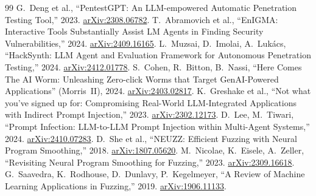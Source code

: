 \documentclass[11pt,a4paper]{article}
\newcommand{\arxiv}[1]{\href{https://arxiv.org/abs/#1}{arXiv:#1}}
\begin{document}
\begin{thebibliography}{99}
 G.~Deng et al., ``PentestGPT: An LLM-empowered Automatic Penetration Testing Tool,'' 2023. \arxiv{2308.06782}.
 T.~Abramovich et al., ``EnIGMA: Interactive Tools Substantially Assist LM Agents in Finding Security Vulnerabilities,'' 2024. \arxiv{2409.16165}.
 L.~Muzsai, D.~Imolai, A.~Luk\'acs, ``HackSynth: LLM Agent and Evaluation Framework for Autonomous Penetration Testing,'' 2024. \arxiv{2412.01778}.
 S.~Cohen, R.~Bitton, B.~Nassi, ``Here Comes The AI Worm: Unleashing Zero-click Worms that Target GenAI-Powered Applications'' (Morris~II), 2024. \arxiv{2403.02817}.
 K.~Greshake et al., ``Not what you've signed up for: Compromising Real-World LLM-Integrated Applications with Indirect Prompt Injection,'' 2023. \arxiv{2302.12173}.
 D.~Lee, M.~Tiwari, ``Prompt Infection: LLM-to-LLM Prompt Injection within Multi-Agent Systems,'' 2024. \arxiv{2410.07283}.
 D.~She et al., ``NEUZZ: Efficient Fuzzing with Neural Program Smoothing,'' 2018. \arxiv{1807.05620}.
 M.~Nicolae, K.~Eisele, A.~Zeller, ``Revisiting Neural Program Smoothing for Fuzzing,'' 2023. \arxiv{2309.16618}.
 G.~Saavedra, K.~Rodhouse, D.~Dunlavy, P.~Kegelmeyer, ``A Review of Machine Learning Applications in Fuzzing,'' 2019. \arxiv{1906.11133}.

\end{thebibliography}
\end{document}
